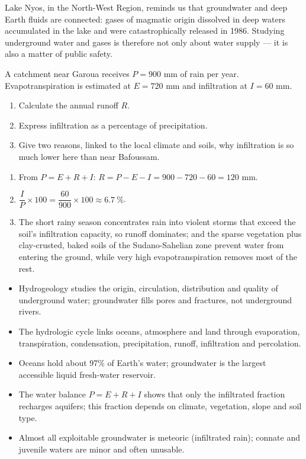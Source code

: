 \documentclass[11pt]{article}
\begin{document}
\begin{savaistu}
Lake Nyos, in the North-West Region, reminds us that groundwater and deep Earth fluids are connected: gases of magmatic origin dissolved in deep waters accumulated in the lake and were catastrophically released in 1986. Studying underground water and gases is therefore not only about water supply --- it is also a matter of public safety.
\end{savaistu}

\begin{exercice}
A catchment near Garoua receives $P = 900$ mm of rain per year. Evapotranspiration is estimated at $E = 720$ mm and infiltration at $I = 60$ mm.
\begin{enumerate}
\item Calculate the annual runoff $R$.
\item Express infiltration as a percentage of precipitation.
\item Give two reasons, linked to the local climate and soils, why infiltration is so much lower here than near Bafoussam.
\end{enumerate}
\end{exercice}

\begin{corrige}[Exercise 1]
\begin{enumerate}
\item From $P = E + R + I$: $R = P - E - I = 900 - 720 - 60 = 120$ mm.
\item $\dfrac{I}{P} \times 100 = \dfrac{60}{900} \times 100 \approx 6.7\ \%$.
\item The short rainy season concentrates rain into violent storms that exceed the soil's infiltration capacity, so runoff dominates; and the sparse vegetation plus clay-crusted, baked soils of the Sudano-Sahelian zone prevent water from entering the ground, while very high evapotranspiration removes most of the rest.
\end{enumerate}
\end{corrige}

\begin{aretenir}
\begin{itemize}
\item Hydrogeology studies the origin, circulation, distribution and quality of underground water; groundwater fills pores and fractures, not underground rivers.
\item The hydrologic cycle links oceans, atmosphere and land through evaporation, transpiration, condensation, precipitation, runoff, infiltration and percolation.
\item Oceans hold about 97\% of Earth's water; groundwater is the largest accessible liquid fresh-water reservoir.
\item The water balance $P = E + R + I$ shows that only the infiltrated fraction recharges aquifers; this fraction depends on climate, vegetation, slope and soil type.
\item Almost all exploitable groundwater is meteoric (infiltrated rain); connate and juvenile waters are minor and often unusable.
\end{itemize}
\end{aretenir}
\end{document}
